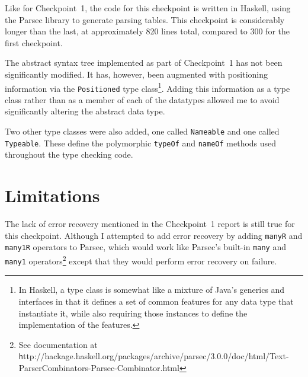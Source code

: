 \documentclass[12pt]{amsart}
\begin{document}
Like for Checkpoint~1, the code for this checkpoint is written in
Haskell, using the Parsec library to generate parsing tables. This
checkpoint is considerably longer than the last, at approximately 820
lines total, compared to 300 for the first checkpoint.

The abstract syntax tree implemented as part of Checkpoint~1 has not
been significantly modified. It has, however, been augmented with
positioning information via the \verb|Positioned| type
class\footnote{In Haskell, a type class is somewhat like a mixture of
  Java's generics and interfaces in that it defines a set of common
  features for any data type that instantiate it, while also requiring
  those instances to define the implementation of the
  features.}. Adding this information as a type class rather than as a
member of each of the datatypes allowed me to avoid significantly
altering the abstract data type.

Two other type classes were also added, one called \verb|Nameable| and
one called \verb|Typeable|. These define the polymorphic \verb|typeOf|
and \verb|nameOf| methods used throughout the type checking code.

\section{Limitations}
The lack of error recovery mentioned in the Checkpoint~1 report is
still true for this checkpoint. Although I attempted to add error
recovery by adding \verb|manyR| and \verb|many1R| operators to Parsec,
which would work like Parsec's built-in \verb|many| and \verb|many1|
operators\footnote{See documentation at {\texttt
    http://hackage.haskell.org/packages/archive/parsec/3.0.0/doc/html/Text-ParserCombinators-Parsec-Combinator.html}}
except that they would perform error recovery on failure.
\end{document}
